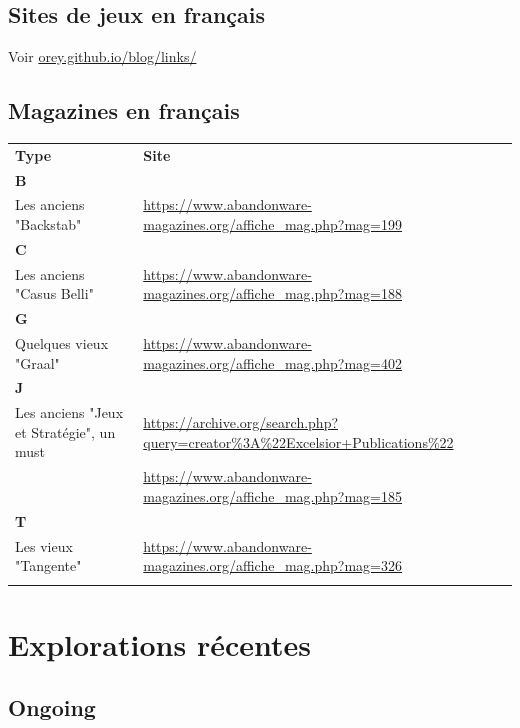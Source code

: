\documentclass[a4paper, 11pt, twoside]{article}
\begin{document}
\subsection{Sites de jeux en français}
\label{sec:orgeffdbe7}

Voir \href{https://orey.github.io/blog/links/}{orey.github.io/blog/links/}


\subsection{Magazines en français}
\label{sec:orgbe7cf75}

\begin{longtable}{p{7cm}p{7cm}}
\textbf{Type} & \textbf{Site}\\
\textbf{B} & \\
Les anciens "Backstab" & \url{https://www.abandonware-magazines.org/affiche\_mag.php?mag=199}\\
\textbf{C} & \\
Les anciens "Casus Belli" & \url{https://www.abandonware-magazines.org/affiche\_mag.php?mag=188}\\
\textbf{G} & \\
Quelques vieux "Graal" & \url{https://www.abandonware-magazines.org/affiche\_mag.php?mag=402}\\
\textbf{J} & \\
Les anciens "Jeux et Stratégie", un must & \url{https://archive.org/search.php?query=creator\%3A\%22Excelsior+Publications\%22}\\
 & \url{https://www.abandonware-magazines.org/affiche\_mag.php?mag=185}\\
\textbf{T} & \\
Les vieux "Tangente" & \url{https://www.abandonware-magazines.org/affiche\_mag.php?mag=326}\\
 & \\
\end{longtable}

\section{Explorations récentes}
\label{sec:org6906dad}

\subsection{Ongoing}
\label{sec:org330f812}
\end{document}
